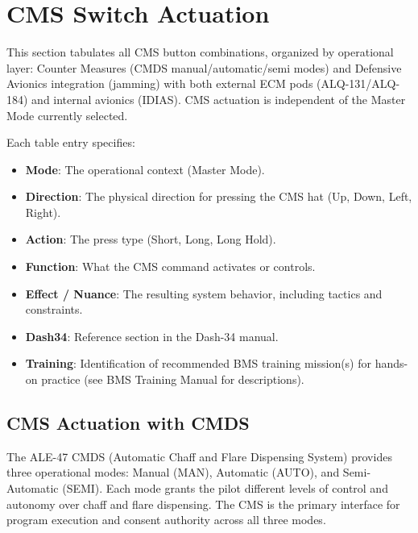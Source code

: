 \documentclass[11pt, a4paper, twoside]{report}
\begin{document}
\section{CMS Switch Actuation}
\label{sec:C5-S2}

This section tabulates all CMS button combinations, organized by operational layer: Counter Measures (CMDS manual/automatic/semi modes) and Defensive Avionics integration (jamming) with both external ECM pods (ALQ-131/ALQ-184) and internal avionics (IDIAS). CMS actuation is independent of the Master Mode currently selected.

Each table entry specifies:

\begin{itemize}
  \item \textbf{Mode}: The operational context (Master Mode).
  \item \textbf{Direction}: The physical direction for pressing the CMS hat (Up, Down, Left, Right).
  \item \textbf{Action}: The press type (Short, Long, Long Hold).
  \item \textbf{Function}: What the CMS command activates or controls.
  \item \textbf{Effect / Nuance}: The resulting system behavior, including tactics and constraints.
  \item \textbf{Dash34}: Reference section in the Dash-34 manual.
  \item \textbf{Training}: Identification of recommended BMS training mission(s) for hands-on practice (see BMS Training Manual for descriptions).
\end{itemize}

\subsection{CMS Actuation with CMDS}
\label{sec:C5-S2-S1}

The ALE-47 CMDS (Automatic Chaff and Flare Dispensing System) provides three operational modes: Manual (MAN), Automatic (AUTO), and Semi-Automatic (SEMI). Each mode grants the pilot different levels of control and autonomy over chaff and flare dispensing. The CMS is the primary interface for program execution and consent authority across all three modes.

\end{document}
